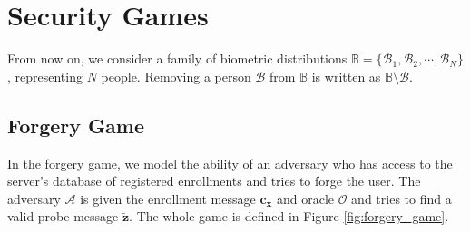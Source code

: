 
\section{Security Games}

From now on, we consider a family of biometric distributions $\mathbb{B} = \{ \mathcal{B}_1, \mathcal{B}_2, \cdots, \mathcal{B}_N \}$, representing $N$ people. Removing a person $\mathcal{B}$ from $\mathbb{B}$ is written as $\mathbb{B} \setminus \mathcal{B}$.

\subsection{Forgery Game}
\label{sec:forgery_game}

In the forgery game, we model the ability of an adversary who has access to the server's database of registered enrollments and tries to forge the user. The adversary $\mathcal{A}$ is given the enrollment message $\mathbf{c_x}$ and oracle $\mathcal{O}$ and tries to find a valid probe message $\mathbf{\tilde{z}}$. The whole game is defined in Figure \ref{fig:forgery_game}.


